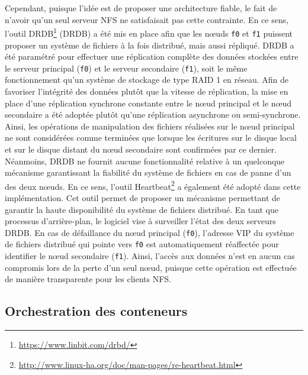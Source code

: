 Cependant, puisque l'idée est de proposer une architecture fiable, le fait de n'avoir qu'un seul serveur \acs{NFS} ne satisfaisait pas cette contrainte. En ce sens, l'outil \acs{DRDB}\footnote{\url{https://www.linbit.com/drbd/}} (\acl{DRDB}) a été mis en place afin que les n\oe{}uds \texttt{f0} et \texttt{f1} puissent proposer un système de fichiers à la fois distribué, mais aussi répliqué. \acs{DRDB} a été paramétré pour effectuer une réplication complète des données stockées entre le serveur principal (\texttt{f0}) et le serveur secondaire (\texttt{f1}), soit le même fonctionnement qu'un système de stockage de type \acs{RAID} 1 en réseau. Afin de favoriser l'intégrité des données plutôt que la vitesse de réplication, la mise en place d'une réplication synchrone constante entre le n\oe{}ud principal et le n\oe{}ud secondaire a été adoptée plutôt qu'une réplication asynchrone ou semi-synchrone. Ainsi, les opérations de manipulation des fichiers réalisées sur le n\oe{}ud principal ne sont considérées comme terminées que lorsque les écritures sur le disque local et sur le disque distant du n\oe{}ud secondaire sont confirmées par ce dernier. Néanmoins, \acs{DRDB} ne fournit aucune fonctionnalité relative à un quelconque mécanisme garantissant la fiabilité du système de fichiers en cas de panne d'un des deux n\oe{}uds. En ce sens, l'outil Heartbeat\footnote{\url{http://www.linux-ha.org/doc/man-pages/re-heartbeat.html}} a également été adopté dans cette implémentation. Cet outil permet de proposer un mécanisme permettant de garantir la haute disponibilité du système de fichiers distribué. En tant que processus d'arrière-plan, le logiciel vise à surveiller l'état des deux serveurs \acs{DRDB}. En cas de défaillance du n\oe{}ud principal (\texttt{f0}), l'adresse \ac{VIP} du système de fichiers distribué qui pointe vers \texttt{f0} est automatiquement réaffectée pour identifier le n\oe{}ud secondaire (\texttt{f1}). Ainsi, l'accès aux données n'est en aucun cas compromis lors de la perte d'un seul n\oe{}ud, puisque cette opération est effectuée de manière transparente pour les clients \acs{NFS}.

\subsection{Orchestration des conteneurs}

